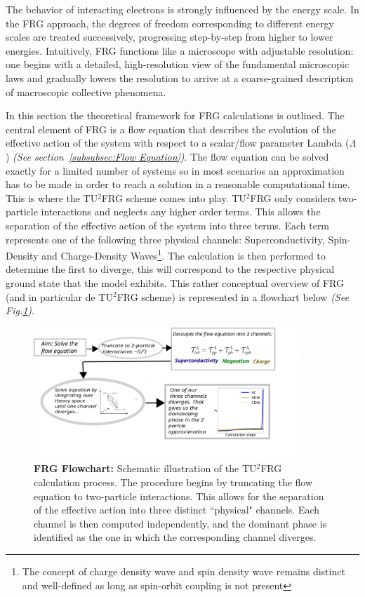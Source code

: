 \documentclass[12pt]{article}
\begin{document}
\medskip

\noindent The behavior of interacting electrons is strongly influenced by the energy scale. In the FRG approach, the degrees of freedom corresponding to different energy scales are treated successively, 
progressing step-by-step from higher to lower energies.
Intuitively, FRG functions like a microscope with adjustable resolution: one begins with a detailed, high-resolution view of the fundamental microscopic laws and gradually lowers the resolution to arrive at a coarse-grained description of macroscopic collective phenomena.
\medskip

\noindent In this section the theoretical framework for FRG calculations is outlined. The central element of FRG is a flow equation that describes the evolution of the effective action of the system with respect to a scalar/flow parameter Lambda ($\Lambda$) \textit{(See section~\ref{subsubsec:Flow Equation})}.
The flow equation can be solved exactly for a limited number of systems so in most scenarios an approximation has to be made in order to reach a solution in a reasonable computational time.  
This is where the TU$^2$FRG scheme comes into play. TU$^2$FRG only considers two-particle
interactions and neglects any higher order terms.
This allows the separation of the effective action of the system into three terms. Each term represents one of the following three physical channels: Superconductivity, Spin-Density and Charge-Density Waves\footnote{The concept of charge density wave and spin density wave remains distinct and well-defined as long as spin-orbit coupling is not present}.
The calculation is then performed to determine the first to diverge, this will correspond to the respective physical ground state that the model exhibits. This rather conceptual overview of FRG (and in particular de TU$^2$FRG scheme) is represented in a flowchart below \textit{(See Fig.\ref{fig:FRGflowdiagram})}.
 

\begin{figure}[htbp]  %
    \centering
    \includegraphics[width=0.9\textwidth]{FRGflowdiagram.png}  %
    \caption{\textbf{FRG Flowchart:} Schematic illustration of the TU$^2$FRG calculation process.
     The procedure begins by truncating the flow equation to two-particle interactions. 
     This allows for the separation of the effective action into three distinct ``physical" channels. 
     Each channel is then computed independently, and the dominant phase is identified as the 
     one in which the corresponding channel diverges.}
    \label{fig:FRGflowdiagram}
\end{figure}
\end{document}
